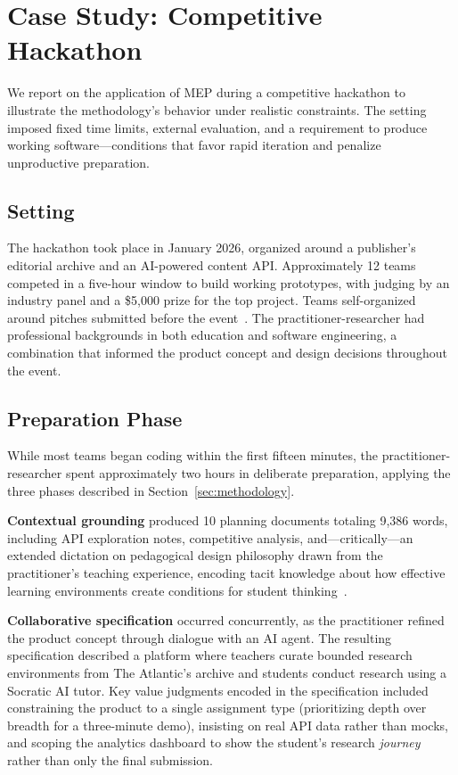 \section{Case Study: Competitive Hackathon}
\label{sec:casestudy}

We report on the application of MEP during a competitive hackathon
to illustrate the methodology's behavior under realistic constraints. The
setting imposed fixed time limits, external evaluation, and a requirement to
produce working software---conditions that favor rapid iteration and
penalize unproductive preparation.

\subsection{Setting}

The hackathon took place in January 2026, organized around a publisher's
editorial archive and an AI-powered content API. Approximately 12 teams
competed in a five-hour window to build working prototypes, with judging
by an industry panel and a \$5{,}000 prize for the top project. Teams
self-organized around pitches submitted before the event~\cite{event2026hackathon}.
The practitioner-researcher had professional backgrounds in both
education and software engineering, a combination that informed the
product concept and design decisions throughout the event.

\subsection{Preparation Phase}

While most teams began coding within the first fifteen minutes, the
practitioner-researcher spent approximately two hours in deliberate
preparation, applying the three phases described in
Section~\ref{sec:methodology}.

\textbf{Contextual grounding} produced 10 planning documents totaling 9,386
words, including API exploration notes, competitive analysis, and---critically---an
extended dictation on pedagogical design philosophy drawn from the practitioner's
teaching experience, encoding tacit knowledge about how effective learning
environments create conditions for student thinking~\cite{polanyi1966tacit}.

\textbf{Collaborative specification} occurred concurrently, as the practitioner
refined the product concept through dialogue with an AI agent. The resulting
specification described a platform where teachers curate bounded research
environments from The Atlantic's archive and students conduct research using a
Socratic AI tutor. Key value judgments encoded in the specification included
constraining the product to a single assignment type (prioritizing depth over
breadth for a three-minute demo),
insisting on real API data rather than mocks, and scoping the analytics dashboard
to show the student's research \emph{journey} rather than only the final submission.

